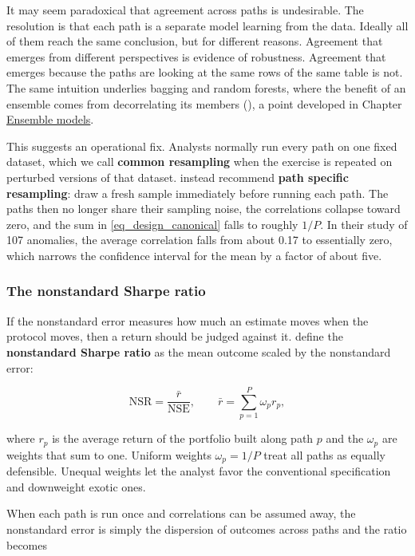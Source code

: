 It may seem paradoxical that agreement across paths is undesirable. The resolution is that each path is a separate model learning from the data. Ideally all of them reach the same conclusion, but for different reasons. Agreement that emerges from different perspectives is evidence of robustness. Agreement that emerges because the paths are looking at the same rows of the same table is not. The same intuition underlies bagging and random forests, where the benefit of an ensemble comes from decorrelating its members (\cite{breiman2001random}), a point developed in Chapter \href{/chap-14-ensemble}{Ensemble models}.

This suggests an operational fix. Analysts normally run every path on one fixed dataset, which we call \textbf{common resampling} when the exercise is repeated on perturbed versions of that dataset. \cite{coqueret2026persistent} instead recommend \textbf{path specific resampling}: draw a fresh sample immediately before running each path. The paths then no longer share their sampling noise, the correlations collapse toward zero, and the sum in \ref{eq_design_canonical} falls to roughly $1/P$. In their study of 107 anomalies, the average correlation falls from about 0.17 to essentially zero, which narrows the confidence interval for the mean by a factor of about five.

\subsubsection{The nonstandard Sharpe ratio}\label{sec_design_nsr}

If the nonstandard error measures how much an estimate moves when the protocol moves, then a return should be judged against it. \cite{coqueret2026persistent} define the \textbf{nonstandard Sharpe ratio} as the mean outcome scaled by the nonstandard error:

\begin{equation}
\label{eq_design_nsr}
\text{NSR} = \frac{\bar{r}}{\text{NSE}}, \qquad \bar{r} = \sum_{p=1}^P \omega_p r_p,
\end{equation}

where $r_p$ is the average return of the portfolio built along path $p$ and the $\omega_p$ are weights that sum to one. Uniform weights $\omega_p = 1/P$ treat all paths as equally defensible. Unequal weights let the analyst favor the conventional specification and downweight exotic ones.

When each path is run once and correlations can be assumed away, the nonstandard error is simply the dispersion of outcomes across paths and the ratio becomes

